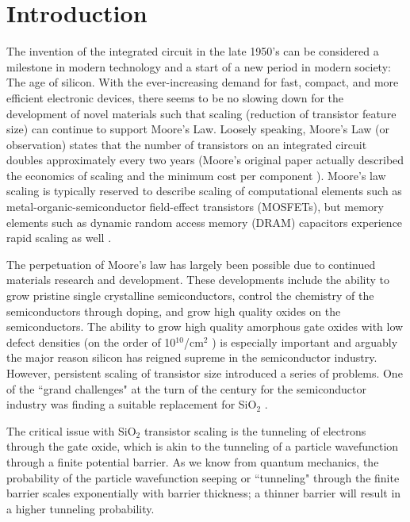 \chapter{Introduction}
     
The invention of the integrated circuit in the late 1950’s can be considered a milestone in modern technology and a start of a new period in modern society: The age of silicon. With the ever-increasing demand for fast, compact, and more efficient electronic devices, there seems to be no slowing down for the development of novel materials such that scaling (reduction of transistor feature size) can continue to support Moore’s Law. Loosely speaking, Moore’s Law (or observation) states that the number of transistors on an integrated circuit doubles approximately every two years (Moore’s original paper actually described the economics of scaling and the minimum cost per component \cite{moore1998}). Moore's law scaling is typically reserved to describe scaling of computational elements such as metal-organic-semiconductor field-effect transistors (MOSFETs), but memory elements such as dynamic random access memory (DRAM) capacitors experience rapid scaling as well \cite{Kim2008}.

The perpetuation of Moore's law has largely been possible due to continued materials research and development. These developments include the ability to grow pristine single crystalline semiconductors, control the chemistry of the semiconductors through doping, and grow high quality oxides on the semiconductors. The ability to grow high quality amorphous gate oxides with low defect densities (on the order of 10$^{10}$/cm$^{2}$ \cite{Wilk2001}) is especially important and arguably the major reason silicon has reigned supreme in the semiconductor industry. However, persistent scaling of transistor size introduced a series of problems. One of the ``grand challenges" at the turn of the century for the semiconductor industry was finding a suitable replacement for SiO$_{2}$ \cite{roadmap1997}.

The critical issue with SiO$_{2}$ transistor scaling is the tunneling of electrons through the gate oxide, which is akin to the tunneling of a particle wavefunction through a finite potential barrier. As we know from quantum mechanics, the probability of the particle wavefunction seeping or ``tunneling" through the finite barrier scales exponentially with barrier thickness; a thinner barrier will result in a higher tunneling probability. 

